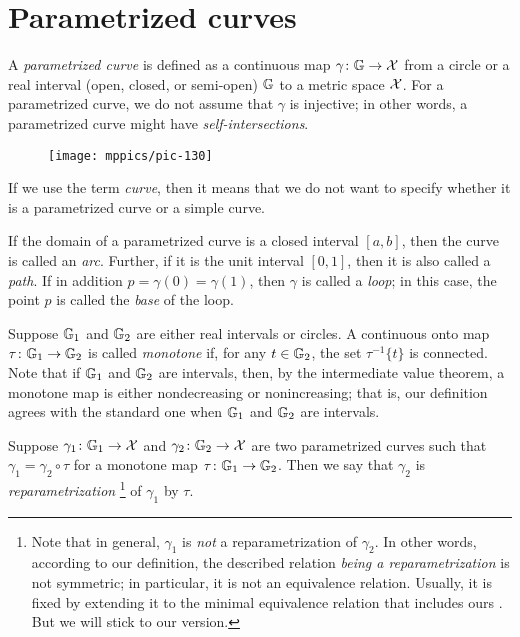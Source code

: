 \section{Parametrized curves}

A \emph{parametrized curve} is defined as a continuous map $\gamma\colon\mathbb{G}\to\mathcal{X}$ from a circle or a real interval (open, closed, or semi-open) $\mathbb{G}$ to a metric space $\mathcal{X}$. 
For a parametrized curve, we do not assume that $\gamma$ is injective; in other words, a parametrized curve might have \emph{self-intersections}.

\begin{wrapfigure}{o}{15 mm}
\vskip-0mm
\centering
\texttt{[image: mppics/pic-130]}
\end{wrapfigure}

If we use the term \emph{curve}, then it means that we do not want to specify whether it is a parametrized curve or a simple curve.

If the domain of a parametrized curve is a closed interval $[a,b]$, then the curve is called an \emph{arc}.
Further, if it is the unit interval $[0,1]$, then it is also called a \emph{path}.
If in addition $p=\gamma(0)=\gamma(1)$, then $\gamma$ is called a \emph{loop};
in this case, the point $p$ is called the \emph{base} of the loop.

Suppose $\mathbb{G}_1$ and $\mathbb{G}_2$ are either real intervals or circles.
A continuous onto map $\tau\colon\mathbb{G}_1\to\mathbb{G}_2$ is called \emph{monotone} if, for any $t\in \mathbb{G}_2$, the set $\tau^{-1}\{t\}$ is connected.
Note that if $\mathbb{G}_1$ and $\mathbb{G}_2$ are intervals, then, by the intermediate value theorem, a monotone map is either nondecreasing or nonincreasing;
that is, our definition agrees with the standard one when $\mathbb{G}_1$ and $\mathbb{G}_2$ are intervals.

Suppose $\gamma_1\colon\mathbb{G}_1\to \mathcal{X}$ and $\gamma_2\colon\mathbb{G}_2\to \mathcal{X}$ are two parametrized curves such that 
$\gamma_1=\gamma_2\circ\tau$ for a monotone map $\tau\colon\mathbb{G}_1\to\mathbb{G}_2$.
Then we say that $\gamma_2$ is \emph{reparametrization}%
\footnote{Note that in general, $\gamma_1$ is \textit{not} a reparametrization of $\gamma_2$.
In other words, according to our definition, the described relation {}\emph{being a reparametrization} is not symmetric;
in particular, it is not an equivalence relation.
Usually, it is fixed by extending it to the minimal equivalence relation that includes ours \cite[2.5.1]{burago-burago-ivanov}.
But we will stick to our version.}
of $\gamma_1$ by $\tau$.


